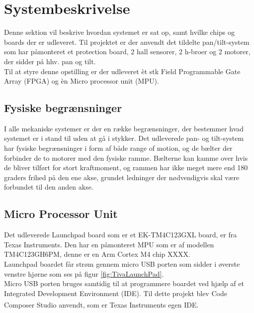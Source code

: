\section{Systembeskrivelse}
Denne sektion vil beskrive hvordan systemet er sat op, samt hvilke chips og boards der er udleveret.
Til projektet er der anvendt det tildelte pan/tilt-system som har påmonteret et protection board, 2 hall sensorer, 2 h-broer og 2 motorer, der sidder på hhv. pan og tilt.\\
Til at styre denne opstilling er der udleveret èt stk Field Programmable Gate Array (FPGA) og èn Micro processor unit (MPU).
\\

\subsection{Fysiske begrænsninger}

I alle mekaniske systemer er der en række begrænsninger, der bestemmer hvad systemet er i stand til uden at gå i stykker. Det udleverede pan- og tilt-system har fysiske begrænsninger i form af både range of motion, og de bælter der forbinder de to motorer med den fysiske ramme. Bælterne kan kamme over hvis de bliver tilført for stort kraftmoment, og rammen har ikke meget mere end 180 graders frihed på den ene akse, grundet ledninger der nødvendigvis skal være forbundet til den anden akse.

\subsection{Micro Processor Unit}
Det udleverede Launchpad board som er et EK-TM4C123GXL board, er fra Texas Instruments. Den har en påmonteret MPU som er af modellen TM4C123GH6PM, denne er en Arm Cortex M4 chip \cite{TM4C123GH6PMDatasheet}XXXX.\\
Launchpad boardet får strøm gennem micro USB porten som sidder i øverste venstre hjørne som ses på figur \ref{fig:TivaLaunchPad}.\\
Micro USB porten bruges samtidig til at programmere boardet ved hjælp af et Integrated Development Environment (IDE). Til dette projekt blev Code Composer Studio \textsuperscript{\texttrademark} anvendt, som er Texas Instruments egen IDE.

